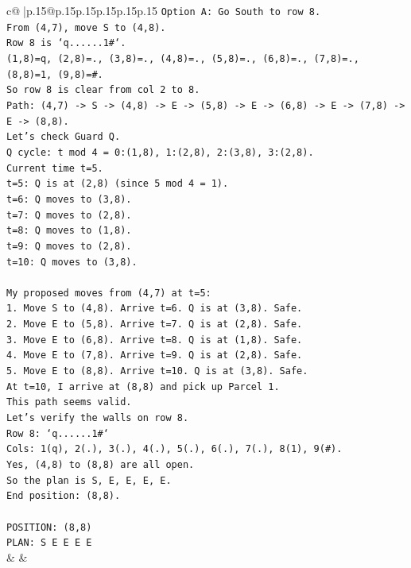 \documentclass{article}
\begin{document}
{\begin{supertabular}{c@{$\;$}|p{.15\linewidth}@{}p{.15\linewidth}p{.15\linewidth}p{.15\linewidth}p{.15\linewidth}p{.15\linewidth}}
{{{\texttt{Option A: Go South to row 8.} \\
\texttt{From (4,7), move S to (4,8).} \\
\texttt{Row 8 is `q......1\#`.} \\
\texttt{(1,8)=q, (2,8)=., (3,8)=., (4,8)=., (5,8)=., (6,8)=., (7,8)=., (8,8)=1, (9,8)=\#.} \\
\texttt{So row 8 is clear from col 2 to 8.} \\
\texttt{Path: (4,7) {-}> S {-}> (4,8) {-}> E {-}> (5,8) {-}> E {-}> (6,8) {-}> E {-}> (7,8) {-}> E {-}> (8,8).} \\
\texttt{Let's check Guard Q.} \\
\texttt{Q cycle: t mod 4 = 0:(1,8), 1:(2,8), 2:(3,8), 3:(2,8).} \\
\texttt{Current time t=5.} \\
\texttt{t=5: Q is at (2,8) (since 5 mod 4 = 1).} \\
\texttt{t=6: Q moves to (3,8).} \\
\texttt{t=7: Q moves to (2,8).} \\
\texttt{t=8: Q moves to (1,8).} \\
\texttt{t=9: Q moves to (2,8).} \\
\texttt{t=10: Q moves to (3,8).} \\
\\ 
\texttt{My proposed moves from (4,7) at t=5:} \\
\texttt{1. Move S to (4,8). Arrive t=6. Q is at (3,8). Safe.} \\
\texttt{2. Move E to (5,8). Arrive t=7. Q is at (2,8). Safe.} \\
\texttt{3. Move E to (6,8). Arrive t=8. Q is at (1,8). Safe.} \\
\texttt{4. Move E to (7,8). Arrive t=9. Q is at (2,8). Safe.} \\
\texttt{5. Move E to (8,8). Arrive t=10. Q is at (3,8). Safe.} \\
\texttt{At t=10, I arrive at (8,8) and pick up Parcel 1.} \\
\texttt{This path seems valid.} \\
\texttt{Let's verify the walls on row 8.} \\
\texttt{Row 8: `q......1\#`} \\
\texttt{Cols: 1(q), 2(.), 3(.), 4(.), 5(.), 6(.), 7(.), 8(1), 9(\#).} \\
\texttt{Yes, (4,8) to (8,8) are all open.} \\
\texttt{So the plan is S, E, E, E, E.} \\
\texttt{End position: (8,8).} \\
\\ 
\texttt{POSITION: (8,8)} \\
\texttt{PLAN: S E E E E} \\
            }
        }
    }
    & & \\ \\


\end{supertabular}}
\end{document}
